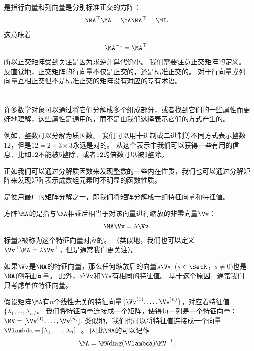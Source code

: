是指行向量和列向量是分别标准正交的方阵：
\begin{equation}
    \MA^\top\MA=\MA\MA^\top=\MI.
\end{equation}
这意味着 
\begin{equation}
    \MA^{-1}=\MA^\top,
\end{equation}
所以正交矩阵受到关注是因为求逆计算代价小。
我们需要注意正交矩阵的定义。
反直觉地，正交矩阵的行向量不仅是正交的，还是标准正交的。
对于行向量或列向量互相正交但不是标准正交的矩阵没有对应的专有术语。




\section{}
\label{sec:eigendecomposition}

许多数学对象可以通过将它们分解成多个组成部分，或者找到它们的一些属性而更好地理解，这些属性是通用的，而不是由我们选择表示它们的方式产生的。


例如，整数可以分解为质因数。
我们可以用十进制或二进制等不同方式表示整数$12$，但是$12=2\times 3\times 3$永远是对的。
从这个表示中我们可以获得一些有用的信息，比如$12$不能被$5$整除，或者$12$的倍数可以被$3$整除。


正如我们可以通过分解质因数来发现整数的一些内在性质，我们也可以通过分解矩阵来发现矩阵表示成数组元素时不明显的函数性质。


是使用最广的矩阵分解之一，即我们将矩阵分解成一组特征向量和特征值。


方阵$\MA$的是指与$\MA$相乘后相当于对该向量进行缩放的非零向量$\Vv$：
\begin{equation}
    \MA\Vv=\lambda \Vv.
\end{equation}
标量$\lambda$被称为这个特征向量对应的。
（类似地，我们也可以定义 $\Vv^\top\MA=\lambda \Vv^\top$，但是通常我们更关注）。


如果$\Vv$是$\MA$的特征向量，那么任何缩放后的向量$s\Vv$~($s\in \SetR$，$s\neq 0$)也是$\MA$的特征向量。
此外，$s\Vv$和$\Vv$有相同的特征值。
基于这个原因，通常我们只考虑单位特征向量。


假设矩阵$\MA$有$n$个线性无关的特征向量$\{\Vv^{(1)}, \dots, \Vv^{(n)}\}$，对应着特征值$\{\lambda_1, \dots , \lambda_n \}$。
我们将特征向量连接成一个矩阵，使得每一列是一个特征向量：$\MV=[\Vv^{(1)}, \dots, \Vv^{(n)}]$.
类似地，我们也可以将特征值连接成一个向量$\Vlambda = [\lambda_1, \dots , \lambda_n]^\top$。
因此$\MA$的可以记作
\begin{equation}
    \MA = \MV \text{diag}(\Vlambda) \MV^{-1}.
\end{equation}


